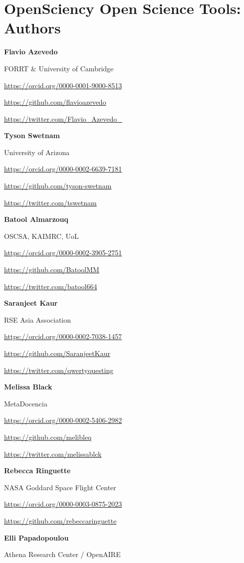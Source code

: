 \documentclass[
  letterpaper,
  DIV=11,
  numbers=noendperiod]{scrreport}
\begin{document}
\hypertarget{opensciency-open-science-tools-authors}{%
\chapter{OpenSciency Open Science Tools:
Authors}\label{opensciency-open-science-tools-authors}}

\textbf{Flavio Azevedo}

FORRT \& University of Cambridge

\url{https://orcid.org/0000-0001-9000-8513}

\url{https://github.com/flavioazevedo}

\url{https://twitter.com/Flavio_Azevedo_}

\textbf{Tyson Swetnam}

University of Arizona

\url{https://orcid.org/0000-0002-6639-7181}

\url{https://github.com/tyson-swetnam}

\url{https://twitter.com/tswetnam}

\textbf{Batool Almarzouq}

OSCSA, KAIMRC, UoL

\url{https://orcid.org/0000-0002-3905-2751}

\url{https://github.com/BatoolMM}

\url{https://twitter.com/batool664}

\textbf{Saranjeet Kaur}

RSE Asia Association

\url{https://orcid.org/0000-0002-7038-1457}

\url{https://github.com/SaranjeetKaur}

\url{https://twitter.com/qwertyquesting}

\textbf{Melissa Black}

MetaDocencia

\url{https://orcid.org/0000-0002-5406-2982}

\url{https://github.com/melibleq}

\url{https://twitter.com/melissablck}

\textbf{Rebecca Ringuette}

NASA Goddard Space Flight Center

\url{https://orcid.org/0000-0003-0875-2023}

\url{https://github.com/rebeccaringuette}

\textbf{Elli Papadopoulou}

Athena Research Center / OpenAIRE
\end{document}
